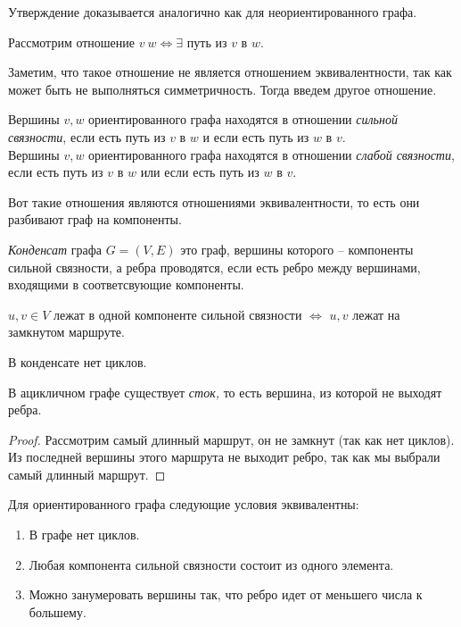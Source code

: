 Утверждение доказывается аналогично как для неориентированного графа.

Рассмотрим отношение $v ~ w \Longleftrightarrow \exists$ путь из $v$ в $w.$

Заметим, что такое отношение не является отношением эквивалентности, так как может быть не выполняться симметричность. Тогда введем другое отношение.

\begin{definition}
     Вершины $v, w$ ориентированного графа находятся в отношении \textit{сильной связности}, если есть путь из $v$ в $w$ и если есть путь из $w$ в $v.$ \\
     Вершины $v, w$ ориентированного графа находятся в отношении \textit{слабой связности}, если есть путь из $v$ в $w$ или если есть путь из $w$ в $v.$ 
\end{definition}

Вот такие отношения являются отношениями эквивалентности, то есть они разбивают граф на компоненты.

\begin{definition}
    \textit{Конденсат} графа $G = (V, E)$ это граф, вершины которого -- компоненты сильной связности, а ребра проводятся, если есть ребро между вершинами, входящими в соответсвующие компоненты.
\end{definition}

\begin{lemma}
    $u, v \in V$ лежат в одной компоненте сильной связности $\Longleftrightarrow$ $u, v$ лежат на замкнутом маршруте.
\end{lemma}


\begin{proposition}
    В конденсате нет циклов.
\end{proposition}

\begin{lemma}
    В ацикличном графе существует \textit{сток,} то есть вершина, из которой не выходят ребра.
\end{lemma}

\begin{proof}
    Рассмотрим самый длинный маршрут, он не замкнут (так как нет циклов). Из последней вершины этого маршрута не выходит ребро, так как мы выбрали самый длинный маршрут.
\end{proof}


\begin{theorem}
    Для ориентированного графа следующие условия эквивалентны:
    \begin{enumerate}
        \item В графе нет циклов.

        \item  Любая компонента сильной связности состоит из одного элемента.

        \item Можно занумеровать вершины так, что ребро идет от меньшего числа к большему.
    \end{enumerate}
\end{theorem}

